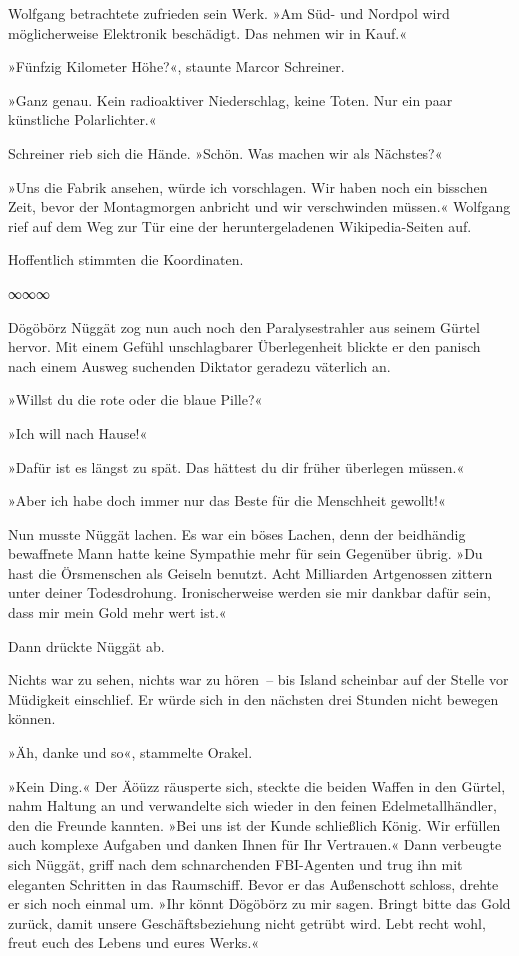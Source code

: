 Wolfgang betrachtete zufrieden sein Werk. »Am Süd- und Nordpol wird möglicherweise Elektronik beschädigt. Das nehmen wir in Kauf.«

»Fünfzig Kilometer Höhe?«, staunte Marcor Schreiner.

»Ganz genau. Kein radioaktiver Niederschlag, keine Toten. Nur ein paar künstliche Polarlichter.«

Schreiner rieb sich die Hände. »Schön. Was machen wir als Nächstes?«

»Uns die Fabrik ansehen, würde ich vorschlagen. Wir haben noch ein bisschen Zeit, bevor der Montagmorgen anbricht und wir verschwinden müssen.« Wolfgang rief auf dem Weg zur Tür eine der heruntergeladenen Wikipedia-Seiten auf.


Hoffentlich stimmten die Koordinaten.

\begin{center}
∞∞∞
\end{center}

Dögöbörz Nüggät zog nun auch noch den Paralysestrahler aus seinem Gürtel hervor. Mit einem Gefühl unschlagbarer Überlegenheit blickte er den panisch nach einem Ausweg suchenden Diktator geradezu väterlich an.

»Willst du die rote oder die blaue Pille?«

»Ich will nach Hause!«

»Dafür ist es längst zu spät. Das hättest du dir früher überlegen müssen.«

»Aber ich habe doch immer nur das Beste für die Menschheit gewollt!«

Nun musste Nüggät lachen. Es war ein böses Lachen, denn der beidhändig bewaffnete Mann hatte keine Sympathie mehr für sein Gegenüber übrig. »Du hast die Örsmenschen als Geiseln benutzt. Acht Milliarden Artgenossen zittern unter deiner Todesdrohung. Ironischerweise werden sie mir dankbar dafür sein, dass mir mein Gold mehr wert ist.«

Dann drückte Nüggät ab.

Nichts war zu sehen, nichts war zu hören~– bis Island scheinbar auf der Stelle vor Müdigkeit einschlief. Er würde sich in den nächsten drei Stunden nicht bewegen können.

»Äh, danke und so«, stammelte Orakel.

»Kein Ding.« Der Äöüzz räusperte sich, steckte die beiden Waffen in den Gürtel, nahm Haltung an und verwandelte sich wieder in den feinen Edelmetallhändler, den die Freunde kannten. »Bei uns ist der Kunde schließlich König. Wir erfüllen auch komplexe Aufgaben und danken Ihnen für Ihr Vertrauen.« Dann verbeugte sich Nüggät, griff nach dem schnarchenden FBI-Agenten und trug ihn mit eleganten Schritten in das Raumschiff. Bevor er das Außenschott schloss, drehte er sich noch einmal um. »Ihr könnt Dögöbörz zu mir sagen. Bringt bitte das Gold zurück, damit unsere Geschäftsbeziehung nicht getrübt wird. Lebt recht wohl, freut euch des Lebens und eures Werks.«

